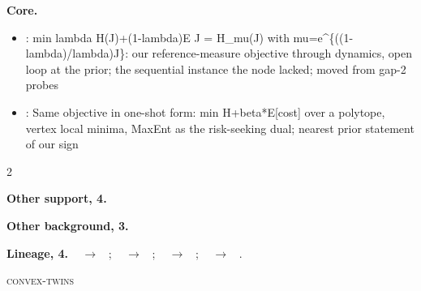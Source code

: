 \documentclass[10pt]{article}
\newcommand{\memb}[1]{\par\smallskip\textbf{#1}\quad}
\begin{document}
\memb{Core.}
\begin{itemize}[nosep,leftmargin=1.2em]
\item \citet{Adurthi-minimum14}: min lambda H(J)+(1-lambda)E J = H\_mu(J) with mu=e\^{}\{((1-lambda)/lambda)J\}: our reference-measure objective through dynamics, open loop at the prior; the sequential instance the node lacked; moved from gap-2 probes
\item \citet{Allahverdyan-adaptive18}: Same objective in one-shot form: min H+beta*E[cost] over a polytope, vertex local minima, MaxEnt as the risk-seeking dual; nearest prior statement of our sign
\end{itemize}
\begin{multicols}{2}
\memb{Other support, 4.} \citetext{\citealp{Yang-measure05}; \citealp{Luce-utility08}; \citealp{Yang-normalized14}; \citealp{Chiew-performance21}}

\memb{Other background, 3.} {\footnotesize \citetext{\citealp{Luce-utility08b}\dag; \citealp{Brito-decision20}; \citealp{Brito-normalized22}\dag}}

\end{multicols}
\memb{Lineage, 4.} {\footnotesize \citeauthor{Grunwald-game04}~\citeyear{Grunwald-game04} $\to$ \citeauthor{Allahverdyan-adaptive18}~\citeyear{Allahverdyan-adaptive18}; \citeauthor{Yang-measure05}~\citeyear{Yang-measure05} $\to$ \citeauthor{Luce-utility08}~\citeyear{Luce-utility08}; \citeauthor{Yang-measure05}~\citeyear{Yang-measure05} $\to$ \citeauthor{Yang-normalized14}~\citeyear{Yang-normalized14}; \citeauthor{Yang-normalized14}~\citeyear{Yang-normalized14} $\to$ \citeauthor{Chiew-performance21}~\citeyear{Chiew-performance21}.}

\medskip\textsc{convex-twins}
\end{document}
